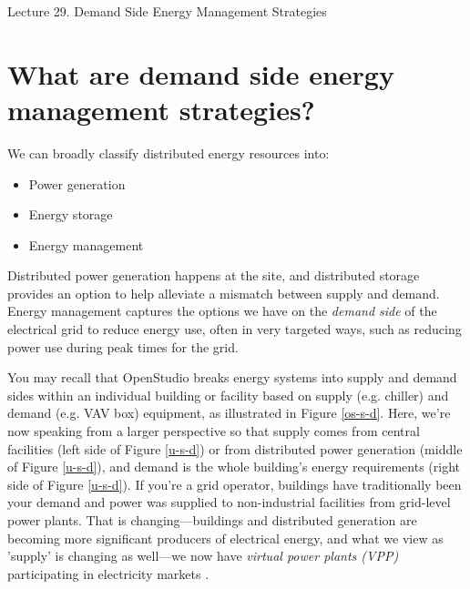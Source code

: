 \documentclass[10pt]{article}
\begin{document}
   \noindent
   \begin{center}

   \hrulefill
   
   \vspace{5pt}
   
   \vspace{0pt}
   
   {\Large \hfill  Lecture 29.  
Demand Side Energy Management Strategies
}
   \vspace{5pt}
   
  
   \hrulefill
   \end{center}
   
    {}


\section{What are demand side energy management strategies?}

We can broadly classify distributed energy resources into:

\begin{itemize}
    \item Power generation
    \item Energy storage
    \item Energy management
\end{itemize}

Distributed power generation happens at the site, and distributed storage provides an option to help alleviate a mismatch between supply and demand. Energy management captures the options we have on the \textit{demand side} of the electrical grid to reduce energy use, often in very targeted ways, such as reducing power use during peak times for the grid. 

You may recall that OpenStudio breaks energy systems into supply and demand sides within an individual building or facility based on supply (e.g. chiller) and demand (e.g. VAV box) equipment, as illustrated in Figure \ref{os-s-d}. Here, we're now speaking from a larger perspective so that supply comes from central facilities (left side of Figure \ref{u-s-d}) or from distributed power generation (middle of Figure \ref{u-s-d}), and demand is the whole building's energy requirements (right side of Figure \ref{u-s-d}). If you're a grid operator, buildings have traditionally been your demand and power was supplied to non-industrial facilities from grid-level power plants. That is changing---buildings and distributed generation are becoming more significant producers of electrical energy, and what we view as 'supply' is changing as well---we  now have \textit{virtual power plants (VPP)} participating in electricity markets \cite{Cohn2018-ja}.
\end{document}
